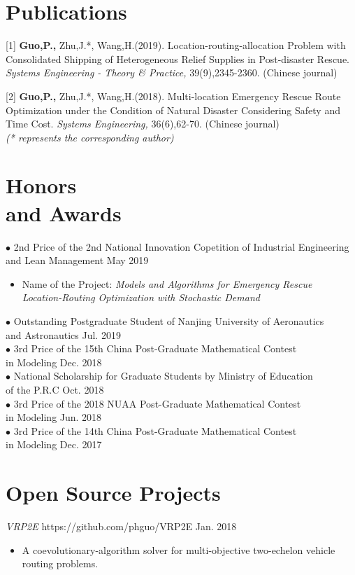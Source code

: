 \documentclass[margin]{res}
\begin{document}
\begin{resume}
\section{\sc Publications}
[1] \textbf{Guo,P.,} Zhu,J.*, Wang,H.(2019). Location-routing-allocation Problem with Consolidated Shipping of Heterogeneous Relief Supplies in Post-disaster Rescue. \textit{Systems Engineering - Theory \& Practice,} 39(9),2345-2360. (Chinese journal)

[2] \textbf{Guo,P.,} Zhu,J.*, Wang,H.(2018). Multi-location Emergency Rescue Route Optimization under the Condition of Natural Disaster Considering Safety and Time Cost. \textit{Systems Engineering,} 36(6),62-70. (Chinese journal) \\
\textit{(* represents the corresponding author)}


\section{\sc Honors \\and Awards}
$\bullet$ 2nd Price of the 2nd National Innovation Copetition of Industrial Engineering\\ and Lean Management \hfill May 2019 
\begin{itemize}  \itemsep -2pt  %
\item Name of the Project: \textit{Models and Algorithms for Emergency Rescue \\Location-Routing Optimization with Stochastic Demand}
\end{itemize} \vspace{-1em}
$\bullet$ Outstanding Postgraduate Student of Nanjing University of Aeronautics \\and Astronautics \hfill Jul. 2019\\
$\bullet$ 3rd Price of the 15th China Post-Graduate Mathematical Contest \\in Modeling \hfill Dec. 2018\\
$\bullet$ National Scholarship for Graduate Students by Ministry of Education \\of the P.R.C \hfill Oct. 2018\\
$\bullet$ 3rd Price of the 2018 NUAA Post-Graduate Mathematical Contest \\in Modeling \hfill Jun. 2018\\
$\bullet$ 3rd Price of the 14th China Post-Graduate Mathematical Contest \\in Modeling \hfill Dec. 2017


\section{\sc Open Source Projects} 
\textit{VRP2E } https://github.com/phguo/VRP2E \hfill Jan. 2018
\begin{itemize} \itemsep -2pt
\item A coevolutionary-algorithm solver for multi-objective two-echelon vehicle routing problems.
\end{itemize}


\end{resume} 
\end{document}
